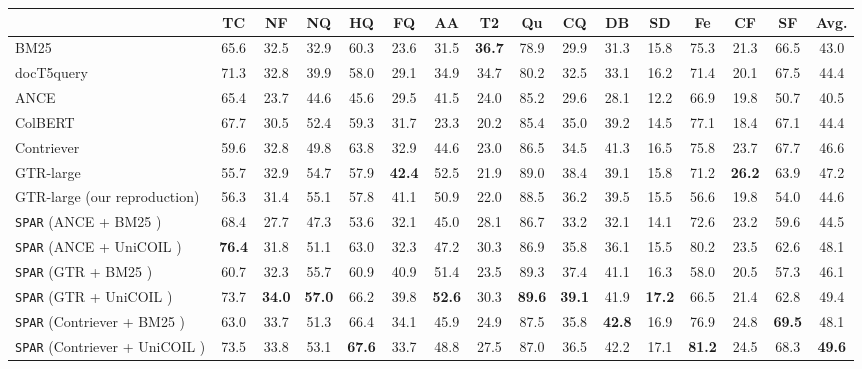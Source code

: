 \documentclass[11pt]{article}
\newcommand{\spar}{\texttt{SPAR}\xspace}
\newcommand{\lexmodelsymbol}{\xspace}
\begin{document}
\begin{table*}[ht]
    \centering
    \small
    \setlength{\tabcolsep}{0.33em}
    \begin{tabular}{l ccccccccccccccc}
    \toprule
    & TC & NF & NQ & HQ & FQ & AA & T2 & Qu & CQ & DB & SD & Fe & CF & SF & \bf Avg. \\
    \midrule
    BM25 & 65.6 & 32.5 & 32.9 & 60.3 & 23.6 & 31.5 & \bf 36.7 & 78.9 & 29.9 & 31.3 & 15.8 & 75.3 & 21.3 & 66.5 & 43.0 \\
    docT5query & 71.3 & 32.8 & 39.9 & 58.0 & 29.1 & 34.9 & 34.7& 80.2 & 32.5 & 33.1 & 16.2 & 71.4 & 20.1 & 67.5 & 44.4 \\
    \midrule
    ANCE & 65.4 & 23.7 & 44.6 & 45.6 & 29.5 & 41.5 & 24.0 & 85.2 & 29.6 & 28.1 & 12.2 & 66.9 & 19.8 & 50.7 & 40.5 \\
    ColBERT & 67.7 & 30.5 & 52.4 & 59.3 & 31.7 & 23.3 & 20.2 & 85.4 & 35.0 & 39.2 & 14.5 & 77.1 & 18.4 & 67.1 & 44.4 \\
    Contriever~\cite{izacard2021unsupervised} & 59.6 & 32.8 & 49.8 & 63.8 & 32.9 & 44.6 & 23.0 & 86.5 & 34.5 & 41.3 & 16.5 & 75.8 & 23.7 & 67.7 & 46.6 \\
    GTR-large~\cite{ni2021large} & 55.7 & 32.9 & 54.7 & 57.9 & \bf 42.4 & 52.5 & 21.9 & 89.0 & 38.4 & 39.1 & 15.8 & 71.2 & \bf 26.2 & 63.9 & 47.2 \\
    GTR-large (our reproduction) & 56.3 & 31.4 & 55.1 & 57.8 & 41.1 & 50.9 & 22.0 & 88.5 & 36.2 & 39.5 & 15.5 & 56.6 & 19.8 & 54.0 & 44.6\\
    \midrule
    \spar{} (ANCE + BM25 \lexmodelsymbol{}) & 68.4 & 27.7 & 47.3 & 53.6 & 32.1 & 45.0 & 28.1 & 86.7 & 33.2 & 32.1 & 14.1 & 72.6 & 23.2 & 59.6  & 44.5 \\
    \spar{} (ANCE + UniCOIL \lexmodelsymbol{}) & \bf 76.4 & 31.8 & 51.1 & 63.0 & 32.3 & 47.2 & 30.3 & 86.9 & 35.8 & 36.1 & 15.5 & 80.2 & 23.5 & 62.6 & 48.1 \\
    \spar{} (GTR + BM25 \lexmodelsymbol{}) & 60.7 & 32.3 & 55.7 & 60.9 & 40.9 & 51.4 & 23.5 & 89.3 & 37.4 & 41.1 & 16.3 & 58.0 & 20.5 & 57.3 & 46.1 \\
    \spar{} (GTR + UniCOIL \lexmodelsymbol{}) & 73.7 & \bf 34.0 & \bf 57.0 & 66.2 & 39.8 & \bf 52.6 & 30.3 & \bf 89.6 & \bf 39.1 & 41.9 & \bf 17.2 & 66.5 & 21.4 & 62.8 & 49.4 \\
    \spar{} (Contriever + BM25 \lexmodelsymbol{}) & 63.0 & 33.7 & 51.3 & 66.4 & 34.1 & 45.9 & 24.9 & 87.5 & 35.8 & \bf 42.8 & 16.9 & 76.9 & 24.8 & \bf 69.5 & 48.1 \\
    \spar{} (Contriever + UniCOIL \lexmodelsymbol{}) & 73.5 & 33.8 & 53.1 & \bf 67.6 & 33.7 & 48.8 & 27.5 & 87.0 & 36.5 & 42.2 & 17.1 & \bf 81.2 & 24.5 & 68.3 & \bf 49.6 \\
    \bottomrule
    \end{tabular}
    \caption{Zero-shot results on BEIR~\cite{thakur2021beir}. All \spar{} models, including the concatenation weights, are trained / tuned on MS MARCO. Dataset Legend: TC=TREC-COVID, NF=NFCorpus, NQ=NaturalQuestions, HQ=HotpotQA, FQ=FiQA, AA=ArguAna, T2=Touch\'e-2020, Qu=Quora, CQ=CQADupStack, DB=DBPedia, SD=SCIDOCS, Fe=FEVER, CF=Climate-FEVER, SF=SciFact.}
    \label{tab:beir_results}
\end{table*}
 
\end{document}
